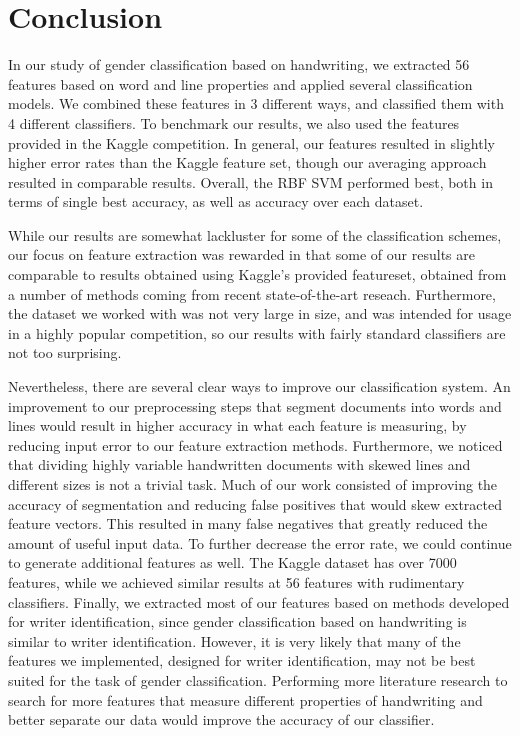 \documentclass[paper=a4, fontsize=11pt]{scrartcl} %
\numberwithin{equation}{section} %
\numberwithin{figure}{section} %
\numberwithin{table}{section} %
\begin{document}
\section{Conclusion}
In our study of gender classification based on handwriting, we
extracted 56 features based on word and line properties and applied
several classification models. We combined these features in 3
different ways, and classified them with 4 different classifiers. To
benchmark our results, we also used the features provided in the
Kaggle competition. In general, our features resulted in slightly
higher error rates than the Kaggle feature set, though our averaging
approach resulted in comparable results. Overall, the RBF SVM
performed best, both in terms of single best accuracy, as well as
accuracy over each dataset.

While our results are somewhat lackluster for some of the
classification schemes, our focus on feature extraction was rewarded
in that some of our results are comparable to results obtained using
Kaggle's provided featureset, obtained from a number of methods coming
from recent state-of-the-art reseach. Furthermore, the dataset we
worked with was not very large in size, and was intended for usage in
a highly popular competition, so our results with fairly standard
classifiers are not too surprising.

Nevertheless, there are several clear ways to improve our
classification system. An improvement to our preprocessing steps that
segment documents into words and lines would result in higher accuracy
in what each feature is measuring, by reducing input error to our
feature extraction methods. Furthermore, we noticed that dividing
highly variable handwritten documents with skewed lines and different
sizes is not a trivial task. Much of our work consisted of improving
the accuracy of segmentation and reducing false positives that would
skew extracted feature vectors. This resulted in many false negatives
that greatly reduced the amount of useful input data. To further
decrease the error rate, we could continue to generate additional
features as well. The Kaggle dataset has over 7000 features, while we
achieved similar results at 56 features with rudimentary
classifiers. Finally, we extracted most of our features based on
methods developed for writer identification, since gender
classification based on handwriting is similar to writer
identification. However, it is very likely that many of the features
we implemented, designed for writer identification, may not be best
suited for the task of gender classification. Performing more
literature research to search for more features that measure different
properties of handwriting and better separate our data would
improve the accuracy of our classifier.



\end{document}
